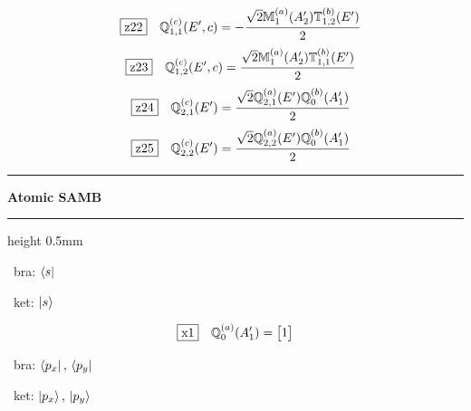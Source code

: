 \documentclass[fleqn,10pt,landscape]{jsarticle}
\begin{document}
\begin{dmath*}
\hspace*{3mm}\fbox{z22}\quad \mathbb{Q}_{1,1}^{(c)}(E^{\prime},c)=- \frac{\sqrt{2} \mathbb{M}_{1}^{(a)}(A_{2}^{\prime}) \mathbb{T}_{1,2}^{(b)}(E^{\prime})}{2}
\end{dmath*}
\begin{dmath*}
\hspace*{3mm}\fbox{z23}\quad \mathbb{Q}_{1,2}^{(c)}(E^{\prime},c)=\frac{\sqrt{2} \mathbb{M}_{1}^{(a)}(A_{2}^{\prime}) \mathbb{T}_{1,1}^{(b)}(E^{\prime})}{2}
\end{dmath*}
\begin{dmath*}
\hspace*{3mm}\fbox{z24}\quad \mathbb{Q}_{2,1}^{(c)}(E^{\prime})=\frac{\sqrt{2} \mathbb{Q}_{2,1}^{(a)}(E^{\prime}) \mathbb{Q}_{0}^{(b)}(A_{1}^{\prime})}{2}
\end{dmath*}
\begin{dmath*}
\hspace*{3mm}\fbox{z25}\quad \mathbb{Q}_{2,2}^{(c)}(E^{\prime})=\frac{\sqrt{2} \mathbb{Q}_{2,2}^{(a)}(E^{\prime}) \mathbb{Q}_{0}^{(b)}(A_{1}^{\prime})}{2}
\end{dmath*}
\vspace{5mm}

\vspace{5mm}
\noindent \rule[0.5mm]{5mm}{0.5mm}\hspace{3mm}\textbf{Atomic SAMB}\hspace{3mm}\leaders\hrule height 0.5mm\hfill\kern0pt
\vspace{3mm}

\vspace{5mm}

\noindent\textbullet\, bra: $\bra{s}$

\noindent\textbullet\, ket: $\ket{s}$

\begin{dmath*}
\fbox{x1}\quad \mathbb{Q}_{0}^{(a)}(A_{1}^{\prime})=\begin{bmatrix} 1 \end{bmatrix}
\end{dmath*}
\vspace{5mm}

\noindent\textbullet\, bra: $\bra{p_{x}},\, \bra{p_{y}}$

\noindent\textbullet\, ket: $\ket{p_{x}},\, \ket{p_{y}}$
\end{document}
